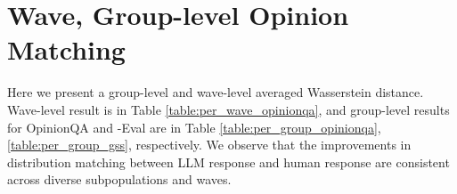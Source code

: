 \section{Wave, Group-level Opinion Matching}
\label{appendix_finegrain}
Here we present a group-level and wave-level averaged Wasserstein distance.
Wave-level result is in Table \ref{table:per_wave_opinionqa},
and group-level results for OpinionQA and \OURDATA-Eval are in Table \ref{table:per_group_opinionqa},
\ref{table:per_group_gss}, respectively.
We observe that the improvements in distribution matching between LLM response and human response are consistent across diverse subpopulations and waves.



